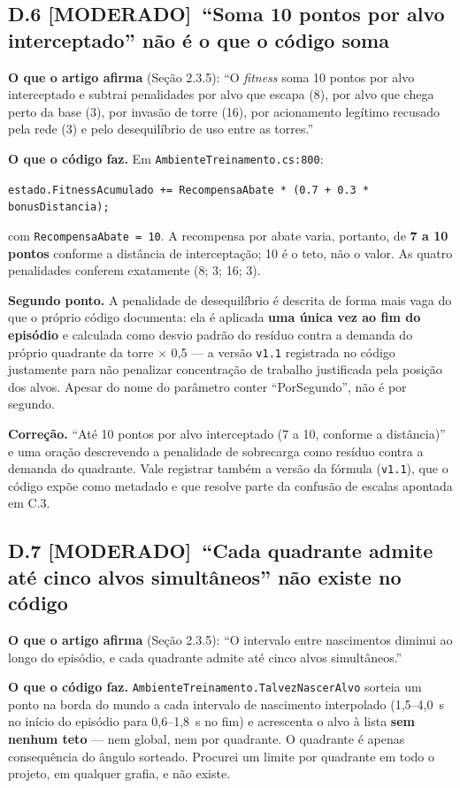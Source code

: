 \documentclass[11pt,a4paper]{article}
\newcommand{\moderado}{\textbf{\color{blue!50!black}[MODERADO]}}
\begin{document}
\subsection*{D.6 \moderado\ ``Soma 10 pontos por alvo interceptado'' não é o que o código soma}

\textbf{O que o artigo afirma} (Seção 2.3.5): ``O \textit{fitness} soma 10 pontos por alvo
interceptado e subtrai penalidades por alvo que escapa (8), por alvo que chega perto da base (3), por
invasão de torre (16), por acionamento legítimo recusado pela rede (3) e pelo desequilíbrio de uso
entre as torres.''

\textbf{O que o código faz.} Em \texttt{AmbienteTreinamento.cs:800}:
\begin{center}
\texttt{estado.FitnessAcumulado += RecompensaAbate * (0.7 + 0.3 * bonusDistancia);}
\end{center}
com \texttt{RecompensaAbate = 10}. A recompensa por abate varia, portanto, de \textbf{7 a 10 pontos}
conforme a distância de interceptação; 10 é o teto, não o valor. As quatro penalidades conferem
exatamente (8; 3; 16; 3).

\textbf{Segundo ponto.} A penalidade de desequilíbrio é descrita de forma mais vaga do que o próprio
código documenta: ela é aplicada \textbf{uma única vez ao fim do episódio} e calculada como desvio
padrão do resíduo contra a demanda do próprio quadrante da torre $\times$ 0,5 --- a versão
\texttt{v1.1} registrada no código justamente para não penalizar concentração de trabalho justificada
pela posição dos alvos. Apesar do nome do parâmetro conter ``PorSegundo'', não é por segundo.

\textbf{Correção.} ``Até 10 pontos por alvo interceptado (7 a 10, conforme a distância)'' e uma
oração descrevendo a penalidade de sobrecarga como resíduo contra a demanda do quadrante. Vale
registrar também a versão da fórmula (\texttt{v1.1}), que o código expõe como metadado e que resolve
parte da confusão de escalas apontada em C.3.

\subsection*{D.7 \moderado\ ``Cada quadrante admite até cinco alvos simultâneos'' não existe no código}

\textbf{O que o artigo afirma} (Seção 2.3.5): ``O intervalo entre nascimentos diminui ao longo do
episódio, e cada quadrante admite até cinco alvos simultâneos.''

\textbf{O que o código faz.} \texttt{AmbienteTreinamento.TalvezNascerAlvo} sorteia um ponto na borda
do mundo a cada intervalo de nascimento interpolado (1,5--4,0~s no início do episódio para
0,6--1,8~s no fim) e acrescenta o alvo à lista \textbf{sem nenhum teto} --- nem global, nem por
quadrante. O quadrante é apenas consequência do ângulo sorteado. Procurei um limite por quadrante em
todo o projeto, em qualquer grafia, e não existe.
\end{document}
